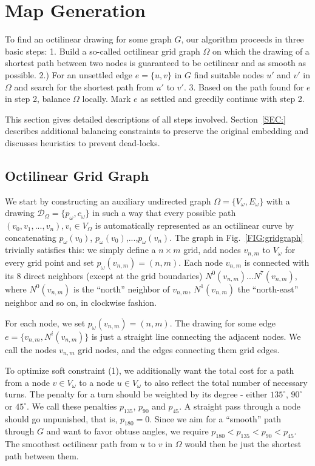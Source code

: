 \documentclass{sig-alternate-sigmod09}
\begin{document}
\section{Map Generation}

To find an octilinear drawing for some graph $G$, our algorithm proceeds in three basic steps: 1. Build a so-called octilinear grid graph $\Omega$ on which the drawing of a shortest path between two nodes is guaranteed to be octilinear and as smooth as possible. 2.) For an unsettled edge $e = \{u, v\}$ in $G$ find suitable nodes $u'$ and $v'$ in $\Omega$ and search for the shortest path from $u'$ to $v'$. 3. Based on the path found for $e$ in step 2, balance $\Omega$ locally. Mark $e$ as settled and greedily continue with step 2.

This section gives detailed descriptions of all steps involved. Section~\ref{SEC:} describes additional balancing constraints to preserve the original embedding and discusses heuristics to prevent dead-locks.

\subsection{Octilinear Grid Graph}

We start by constructing an auxiliary undirected graph $\Omega = \{V_\omega, E_\omega\}$ with a drawing $\mathcal{D}_\Omega = \{p_\omega, c_\omega\}$ in such a way that every possible path $(v_0, v_1, ..., v_n), v_i \in V_\Omega$ is automatically represented as an octilinear curve by concatenating $p_\omega(v_0)$, $p_\omega(v_0)$,$...$,$p_\omega(v_n)$. The graph in Fig.~\ref{FIG:gridgraph} trivially satisfies this: we simply define a $n\times m$ grid, add nodes $v_{n,m}$ to $V_\omega$ for every grid point and set $p_\omega(v_{n,m}) = (n, m)$. Each node $v_{n,m}$ is connected with its 8 direct neighbors (except at the grid boundaries) $N^0(v_{n,m}) ... N^7(v_{n, m})$, where $N^0(v_{n,m})$ is the ``north'' neighbor of $v_{n, m}$,  $N^1(v_{n,m})$ the ``north-east'' neighbor and so on, in clockwise fashion.

For each node, we set $p_\omega(v_{n, m}) = (n, m)$. The drawing for some edge $e = \{v_{n, m}, N^i(v_{n, m})\}$ is just a straight line connecting the adjacent nodes. We call the nodes $v_{n, m}$ grid nodes, and the edges connecting them grid edges.

To optimize soft constraint (1), we additionally want the total cost for a path from a node $v \in V_\omega$ to a node $u \in V_\omega$ to also reflect the total number of necessary turns. The penalty for a turn should be weighted by its degree - either $135^{\circ}$, $90^{\circ}$ or $45^{\circ}$. We call these penalties $p_{135}$, $p_{90}$ and $p_{45}$. A straight pass through a node should go unpunished, that is, $p_{180} = 0$. Since we aim for a ``smooth'' path through $G$ and want to favor obtuse angles, we require $p_{180} < p_{135} < p_{90} < p_{45}$. The smoothest octilinear path from $u$ to $v$ in $\Omega$ would then be just the shortest path between them.
\end{document}

